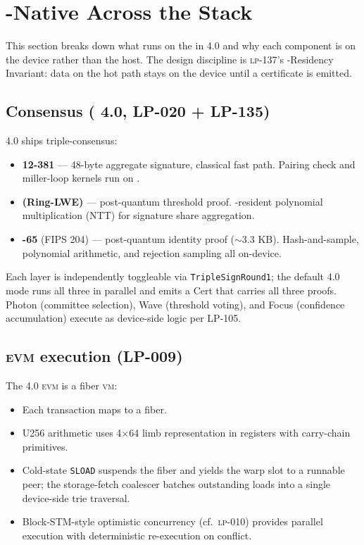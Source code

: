 \section{\GPU{}-Native Across the Stack}
\label{sec:gpu-native}

This section breaks down what runs on the \GPU{} in \Zoo{} 4.0 and why each
component is on the device rather than the host. The design discipline is
\textsc{lp-137}'s \GPU{}-Residency Invariant: data on the hot path stays on
the device until a certificate is emitted.

\subsection{Consensus (\Quasar{} 4.0, LP-020 + LP-135)}

\Quasar{} 4.0 ships triple-consensus:

\begin{itemize}[leftmargin=1.2em]
  \item \textbf{\BLS{}12-381} --- 48-byte aggregate signature, classical
        fast path. Pairing check and miller-loop kernels run on \GPU{}.
  \item \textbf{\Ringtail{} (Ring-LWE)} --- post-quantum threshold proof.
        \GPU{}-resident polynomial multiplication (NTT) for signature
        share aggregation.
  \item \textbf{\MLDSA{}-65} (FIPS 204) --- post-quantum identity proof
        ($\sim$3.3 KB). Hash-and-sample, polynomial arithmetic, and
        rejection sampling all on-device.
\end{itemize}

Each layer is independently toggleable via \texttt{TripleSignRound1}; the
default 4.0 mode runs all three in parallel and emits a \Quasar{}Cert
that carries all three proofs. Photon (committee selection), Wave
(threshold voting), and Focus (confidence accumulation) execute as
device-side logic per LP-105.

\subsection{\textsc{evm} execution (LP-009)}

The \Zoo{} 4.0 \textsc{evm} is a fiber \textsc{vm}:

\begin{itemize}[leftmargin=1.2em]
  \item Each transaction maps to a \GPU{} fiber.
  \item U256 arithmetic uses 4$\times$64 limb representation in registers
        with carry-chain primitives.
  \item Cold-state \texttt{SLOAD} suspends the fiber and yields the warp
        slot to a runnable peer; the storage-fetch coalescer batches
        outstanding loads into a single device-side trie traversal.
  \item Block-STM-style optimistic concurrency
        \cite{zoo-per-llm-chains} (cf.~\textsc{lp-010}) provides parallel
        execution with deterministic re-execution on conflict.
\end{itemize}

